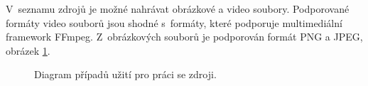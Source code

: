 V~seznamu zdrojů je možné nahrávat obrázkové a video soubory. Podporované formáty video souborů jsou shodné s~formáty, které podporuje multimediální framework FFmpeg. Z~obrázkových souborů je podporován formát PNG a JPEG, obrázek \ref{img:ucd-zdroj}.
\begin{figure}[h]
	\centering
	\caption{Diagram případů užití pro práci se zdroji.}\label{img:ucd-zdroj}
\end{figure}

